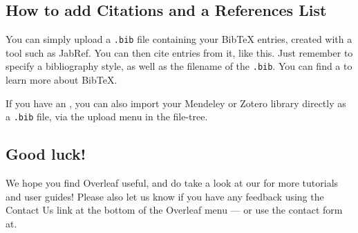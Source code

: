 \subsection{How to add Citations and a References List}

You can simply upload a \verb|.bib| file containing your BibTeX entries, created
with a tool such as JabRef. You can then cite entries from it, like this. Just
remember to specify a bibliography style, as well as the filename of the \verb|.bib|.
You can find a to learn more about BibTeX.

If you have an , you can also import your Mendeley or Zotero library directly as
a \verb|.bib| file, via the upload menu in the file-tree.

\subsection{Good luck!}

We hope you find Overleaf useful, and do take a look at our for more tutorials and
user guides! Please also let us know if you have any feedback using the Contact
Us link at the bottom of the Overleaf menu --- or use the contact form at.